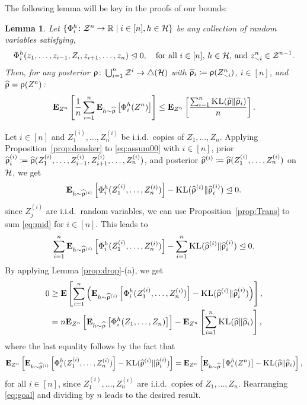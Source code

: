 \documentclass{article}
\makeatletter
\newcommand{\ro}{\uprho}
\newcommand{\hro}{\what{\uprho}}
\renewenvironment{proof}[1][\proofname]{\par
	\pushQED{\qed}%
	\normalfont \topsep6\p@\@plus6\p@\relax
	\trivlist
	\item[%
	\hskip\labelsep
	\normalfont\bfseries %
	#1%
	]\ignorespaces
}{%
	\popQED\endtrivlist\@endpefalse
}
\let\qed\relax %
\DeclareRobustCommand{\qed}{%
	\ifmmode \mathqed
	\else
	\leavevmode\unskip\penalty\@M\hbox{}\nobreak\hfill%
	\hbox{\qedsymbol}%
	\fi
}
\newtheorem{lemma}[theorem]{Lemma}
\makeatother
\begin{document}
The following lemma will be key in the proofs of our bounds:
\begin{lemma}
	\label{lemma:mainlem}
	Let $\{\Phi^{  h}_{i}\colon \mathcal Z^n \rightarrow {\mathbb R} \mid i\in[n], h \in  \mathcal H \}$ be any collection of random variables satisfying, \begin{align}  \Phi^{h}_{i}(z_1,\dots, z_{i-1}, Z_i, z_{i+1},\dots, z_n) \trianglelefteq 0,\quad \text{for all $i\in[n]$, $h \in  \mathcal H$, and $z^n_{\smallsetminus i} \in \mathcal Z^{n-1}$.} \label{eq:assum00}\end{align}
	Then, for any posterior $  \ro \colon \bigcup_{i=1}^n \cZ^i \rightarrow \triangle( \cH)$ with $\hro_i \coloneqq  \ro(Z^n_{\smallsetminus i})$, $i\in [n]$, and $\hro=  \ro(Z^n)$:
	\begin{align}
	\E_{Z^n}\left[ \frac{1}{n}\sum_{i=1}^n  \E_{ h \sim \hro}  \left[ \Eff^{  h}_{i}(Z^n)\right]\right] \leq 	 \E_{Z^n}\left[ \frac{\sum_{i=1}^n\KL(\hro \| \hro_{i})}{ n} \right].
	\end{align}
\end{lemma}
\begin{proof} Let $i\in[n]$ and $Z^{(i)}_1, \dots, Z^{(i)}_n$ be i.i.d.~copies of $Z_1, \dots, Z_n$. Applying Proposition~\ref{prop:donsker} to \eqref{eq:assum00} with $i\in [n]$, prior $\hro^{(i)}_{i} \coloneqq  \hro(Z^{(i)}_1, \dots, Z^{(i)}_{i-1},Z^{(i)}_{i+1}  ,\dots, Z^{(i)}_n)$, and posterior $\hro^{(i)}\coloneqq \hro(Z^{(i)}_1, \dots,Z^{(i)}_n)$ on $ \mathcal H$, we get 
	\begin{align}
	\E_{  h \sim \hro^{(i)}} \left[ \Eff_i^{  h}(Z^{(i)}_1, \dots, Z^{(i)}_n) \right]- \KL(\hro^{(i)}\|\hro_i^{(i)}) \stochleq 0. \label{eq:mid}
	\end{align}
	since $Z^{(i)}_j$ are i.i.d.~random variables, we can use Proposition~\ref{prop:Trans} to sum \eqref{eq:mid} for $i\in[n]$. This leads to 
	\begin{align}
	\sum_{i=1}^n	\E_{  h \sim \hro^{(i)}} \left[ \Eff_i^{  h}(Z^{(i)}_1, \dots, Z^{(i)}_n) \right]-\sum_{i=1}^n \KL(\hro^{(i)}\|\hro_i^{(i)}) \stochleq 0.
	\end{align}
	By applying Lemma \ref{prop:drop}-(a), we get 
	\begin{align}
	0 &\geq \E\left[ \sum_{i=1}^n \left(	\E_{ h \sim \hro^{(i)}} \left[ \Eff_i^{  h}(Z^{(i)}_1, \dots, Z^{(i)}_n) \right] - \KL(\hro^{(i)}\|\hro_i^{(i)})  \right)  \right], \\
	& = n  \E_{Z^n}  \left[	\E_{h \sim   \hro} \left[ \Eff_i^{  h}(Z_1, \dots, Z_n) \right]\right]   - \E_{Z^n}  \left[\sum_{i=1}^n \KL(\hro\|\hro_i)  \right], \label{eq:goal}
	\end{align}
	where the last equality follows by the fact that
	\begin{align*}
	\E_{Z^n}\left[\E_{ h \sim \hro^{(i)}} \left[ \Eff_i^{  h}(Z^{(i)}_1, \dots, Z^{(i)}_n)\right] - \KL(\hro^{(i)}\|\hro_i^{(i)})   \right] =  \E_{Z^n}\left[	\E_{ h \sim   \hro} \left[ \Eff_i^{  h}(Z^n) \right] - \KL(\hro\|\hro_i)   \right], 
	\end{align*}
	for all $i\in[n]$, since $Z^{(i)}_1, \dots, Z^{(i)}_n$ are i.i.d.~copies of $Z_1, \dots, Z_n$. Rearranging \eqref{eq:goal} and dividing by $n$ leads to the desired result.
\end{proof}
\end{document}
